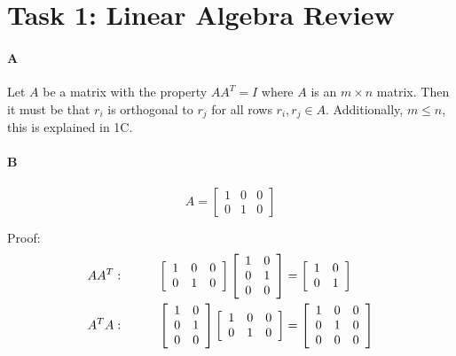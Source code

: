 \documentclass[12pt]{article}
\begin{document}
\maketitle

\section{Task 1: Linear Algebra Review}

\paragraph{A}
Let $A$ be a matrix with the property $AA^T = I$ where $A$ is an $m\times n$ matrix.  Then it must be that $r_i$ is orthogonal to $r_j$ for all rows $r_i, r_j \in A$.  Additionally, $m \leq n$, this is explained in 1C.

\paragraph{B}
\begin{equation*}
A = \left[ \begin{array}{ccc} 1 & 0 & 0 \\ 0 & 1 & 0 \end{array} \right]
\end{equation*}

Proof: \\
\begin{align*}
AA^T:\hspace{10 mm}
\left[ \begin{array}{ccc} 1 & 0 & 0 \\ 0 & 1 & 0 \end{array} \right]
\left[ \begin{array}{cc} 1 & 0  \\ 0 & 1 \\ 0 & 0 \end{array} \right]
&=\left[ \begin{array}{cc} 1 & 0  \\ 0 & 1 \end{array} \right] \\
A^TA:\hspace{10 mm}
\left[ \begin{array}{cc} 1 & 0  \\ 0 & 1 \\ 0 & 0 \end{array} \right]
\left[ \begin{array}{ccc} 1 & 0 & 0 \\ 0 & 1 & 0 \end{array} \right]
&=\left[ \begin{array}{ccc} 1 & 0 & 0  \\ 0 & 1 & 0 \\ 0 & 0 & 0 \end{array} \right]
\end{align*}
\end{document}
